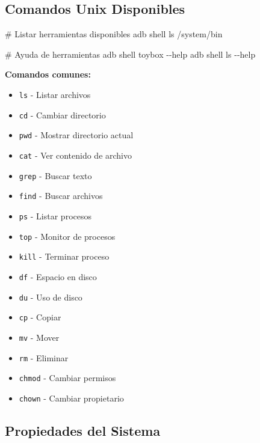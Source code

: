 \documentclass[
  doc,
  floatsintext,
  longtable,
  a4paper,
  nolmodern,
  notxfonts,
  notimes,
  12pt,
  colorlinks=true,linkcolor=blue,citecolor=blue,urlcolor=blue]{apa7}
\newenvironment{Shaded}{\begin{snugshade}}{\end{snugshade}}
\newcommand{\AttributeTok}[1]{\textcolor[rgb]{0.40,0.45,0.13}{#1}}
\newcommand{\CommentTok}[1]{\textcolor[rgb]{0.37,0.37,0.37}{#1}}
\newcommand{\ExtensionTok}[1]{\textcolor[rgb]{0.00,0.23,0.31}{#1}}
\newcommand{\NormalTok}[1]{\textcolor[rgb]{0.00,0.23,0.31}{#1}}
\providecommand{\tightlist}{%
  \setlength{\itemsep}{0pt}\setlength{\parskip}{0pt}}
\begin{document}
\subsection{Comandos Unix Disponibles}\label{comandos-unix-disponibles}

\begin{Shaded}
\begin{Highlighting}[]
\CommentTok{\# Listar herramientas disponibles}
\ExtensionTok{adb}\NormalTok{ shell ls /system/bin}

\CommentTok{\# Ayuda de herramientas}
\ExtensionTok{adb}\NormalTok{ shell toybox }\AttributeTok{{-}{-}help}
\ExtensionTok{adb}\NormalTok{ shell ls }\AttributeTok{{-}{-}help}
\end{Highlighting}
\end{Shaded}

\textbf{Comandos comunes:}

\begin{itemize}
\tightlist
\item
  \texttt{ls} - Listar archivos
\item
  \texttt{cd} - Cambiar directorio
\item
  \texttt{pwd} - Mostrar directorio actual
\item
  \texttt{cat} - Ver contenido de archivo
\item
  \texttt{grep} - Buscar texto
\item
  \texttt{find} - Buscar archivos
\item
  \texttt{ps} - Listar procesos
\item
  \texttt{top} - Monitor de procesos
\item
  \texttt{kill} - Terminar proceso
\item
  \texttt{df} - Espacio en disco
\item
  \texttt{du} - Uso de disco
\item
  \texttt{cp} - Copiar
\item
  \texttt{mv} - Mover
\item
  \texttt{rm} - Eliminar
\item
  \texttt{chmod} - Cambiar permisos
\item
  \texttt{chown} - Cambiar propietario
\end{itemize}

\subsection{Propiedades del Sistema}\label{propiedades-del-sistema}
\end{document}
